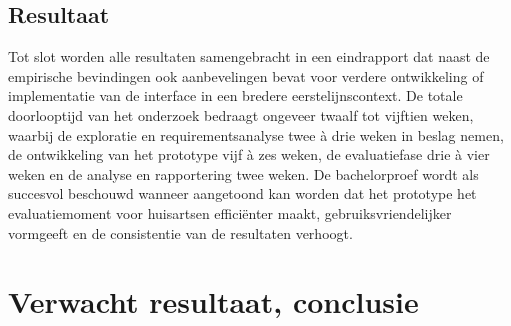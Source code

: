 \subsection{Resultaat}
\label{ter:Resultaat}
Tot slot worden alle resultaten samengebracht in een eindrapport dat naast de empirische bevindingen ook aanbevelingen bevat voor verdere ontwikkeling of implementatie van de interface in een bredere eerstelijnscontext.
De totale doorlooptijd van het onderzoek bedraagt ongeveer twaalf tot vijftien weken, waarbij de exploratie en requirementsanalyse twee à drie weken in beslag nemen, de ontwikkeling van het prototype vijf à zes weken, de evaluatiefase drie à vier weken en de analyse en rapportering twee weken.
De bachelorproef wordt als succesvol beschouwd wanneer aangetoond kan worden dat het prototype het evaluatiemoment voor huisartsen efficiënter maakt, gebruiksvriendelijker vormgeeft en de consistentie van de resultaten verhoogt.

\section{Verwacht resultaat, conclusie}%
\label{sec:verwachte_resultaten}



